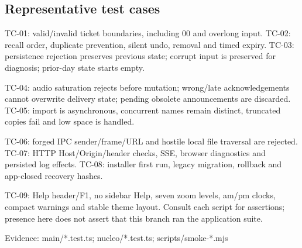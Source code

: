 \subsection{Representative test cases}

TC-01: valid/invalid ticket boundaries, including 00 and overlong input. TC-02: recall order, duplicate prevention, silent undo, removal and timed expiry. TC-03: persistence rejection preserves previous state; corrupt input is preserved for diagnosis; prior-day state starts empty.

TC-04: audio saturation rejects before mutation; wrong/late acknowledgements cannot overwrite delivery state; pending obsolete announcements are discarded. TC-05: import is asynchronous, concurrent names remain distinct, truncated copies fail and low space is handled.

TC-06: forged IPC sender/frame/URL and hostile local file traversal are rejected. TC-07: HTTP Host/Origin/header checks, SSE, browser diagnostics and persisted log effects. TC-08: installer first run, legacy migration, rollback and app-closed recovery hashes.

TC-09: Help header/F1, no sidebar Help, seven zoom levels, am/pm clocks, compact warnings and stable theme layout. Consult each script for assertions; presence here does not assert that this branch ran the application suite.

Evidence: main/*.test.ts; nucleo/*.test.ts; scripts/smoke-*.mjs
